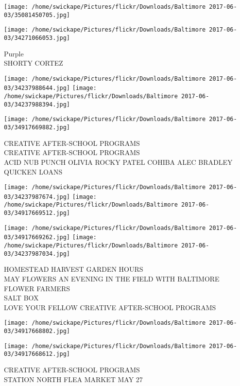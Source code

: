 \documentclass[10pt,letterpaper]{article}
\begin{document}
\texttt{[image: /home/swickape/Pictures/flickr/Downloads/Baltimore 2017-06-03/35081450705.jpg]}

\vspace{0.25in}
\texttt{[image: /home/swickape/Pictures/flickr/Downloads/Baltimore 2017-06-03/34271066053.jpg]}

Purple\\
SHORTY CORTEZ\\
\pagebreak

\texttt{[image: /home/swickape/Pictures/flickr/Downloads/Baltimore 2017-06-03/34237988644.jpg]}
\texttt{[image: /home/swickape/Pictures/flickr/Downloads/Baltimore 2017-06-03/34237988394.jpg]}

\vspace{0.25in}
\texttt{[image: /home/swickape/Pictures/flickr/Downloads/Baltimore 2017-06-03/34917669882.jpg]}

CREATIVE AFTER{-}SCHOOL PROGRAMS\\
CREATIVE AFTER{-}SCHOOL PROGRAMS\\
ACID NUB PUNCH OLIVIA ROCKY PATEL COHIBA ALEC BRADLEY QUICKEN LOANS\\
\pagebreak

\texttt{[image: /home/swickape/Pictures/flickr/Downloads/Baltimore 2017-06-03/34237987674.jpg]}
\texttt{[image: /home/swickape/Pictures/flickr/Downloads/Baltimore 2017-06-03/34917669512.jpg]}

\texttt{[image: /home/swickape/Pictures/flickr/Downloads/Baltimore 2017-06-03/34917669262.jpg]}
\texttt{[image: /home/swickape/Pictures/flickr/Downloads/Baltimore 2017-06-03/34237987034.jpg]}

HOMESTEAD HARVEST GARDEN HOURS\\
MAY FLOWERS AN EVENING IN THE FIELD WITH BALTIMORE FLOWER FARMERS\\
SALT BOX\\
LOVE YOUR FELLOW CREATIVE AFTER{-}SCHOOL PROGRAMS\\
\pagebreak

\texttt{[image: /home/swickape/Pictures/flickr/Downloads/Baltimore 2017-06-03/34917668802.jpg]}

\vspace{0.25in}
\texttt{[image: /home/swickape/Pictures/flickr/Downloads/Baltimore 2017-06-03/34917668612.jpg]}

CREATIVE AFTER{-}SCHOOL PROGRAMS\\
STATION NORTH FLEA MARKET MAY 27\\
\pagebreak
\end{document}
